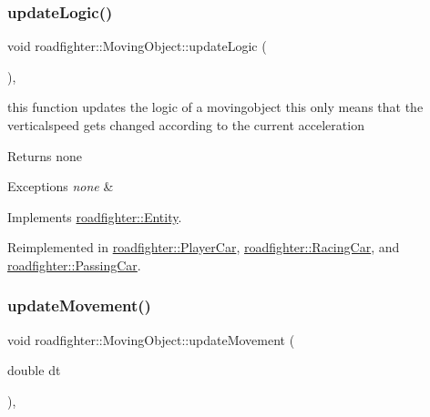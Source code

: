 \subsubsection{\texorpdfstring{update\+Logic()}{updateLogic()}}
{\footnotesize\ttfamily void roadfighter\+::\+Moving\+Object\+::update\+Logic (\begin{DoxyParamCaption}{ }\end{DoxyParamCaption})\hspace{0.3cm}{\ttfamily [override]}, {\ttfamily [virtual]}}

this function updates the logic of a movingobject this only means that the verticalspeed gets changed according to the current acceleration \begin{DoxyReturn}{Returns}
none 
\end{DoxyReturn}

\begin{DoxyExceptions}{Exceptions}
{\em none} & \\
\hline
\end{DoxyExceptions}


Implements \hyperlink{classroadfighter_1_1Entity_a54c00f1af306290bae3e4b84e196566b}{roadfighter\+::\+Entity}.



Reimplemented in \hyperlink{classroadfighter_1_1PlayerCar_a01480487ca7978a50a3c6609f1ebe6df}{roadfighter\+::\+Player\+Car}, \hyperlink{classroadfighter_1_1RacingCar_af3f3b4c368ba61c13dc9b99004895c5d}{roadfighter\+::\+Racing\+Car}, and \hyperlink{classroadfighter_1_1PassingCar_ac3fe3087290121bf44880f94efa3a916}{roadfighter\+::\+Passing\+Car}.

\mbox{\label{classroadfighter_1_1MovingObject_ac1918d96dac118c4bd7d99168d92867c}} 
\subsubsection{\texorpdfstring{update\+Movement()}{updateMovement()}}
{\footnotesize\ttfamily void roadfighter\+::\+Moving\+Object\+::update\+Movement (\begin{DoxyParamCaption}\item[{double}]{dt }\end{DoxyParamCaption})\hspace{0.3cm}{\ttfamily [override]}, {\ttfamily [virtual]}}


